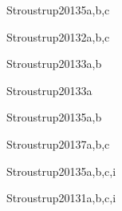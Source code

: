 \begin{syllabus}
   \begin{unit}{\SDFAlgorithmsandDesign}{}{Stroustrup2013}{5}{a,b,c}
      \SDFAlgorithmsandDesignAllTopics
      \SDFAlgorithmsandDesignAllLearningOutcomes
   \end{unit}
   
   \begin{unit}{\PLEventDrivenandReactiveProgramming}{}{Stroustrup2013}{2}{a,b,c}
      \PLEventDrivenandReactiveProgrammingAllTopics
      \PLEventDrivenandReactiveProgrammingAllLearningOutcomes
   \end{unit}
   
   \begin{unit}{\ALBasicAnalysis}{}{Stroustrup2013}{3}{a,b}
         \ALBasicAnalysisAllTopics
         \ALBasicAnalysisAllLearningOutcomes      
   \end{unit}
   
   \begin{unit}{\ALFundamentalDataStructuresandAlgorithms}{}{Stroustrup2013}{3}{a}
      \ALFundamentalDataStructuresandAlgorithmsAllTopics
      \ALFundamentalDataStructuresandAlgorithmsAllLearningOutcomes
   \end{unit}
   
   \begin{unit}{\OSOperatingSystemPrinciples}{}{Stroustrup2013}{5}{a,b}
      \OSOperatingSystemPrinciplesAllTopics
      \OSOperatingSystemPrinciplesAllLearningOutcomes
   \end{unit}
   
   \begin{unit}{\PLObjectOrientedProgramming}{}{Stroustrup2013}{7}{a,b,c}
      \PLObjectOrientedProgrammingAllTopics
      \PLObjectOrientedProgrammingAllLearningOutcome
   \end{unit}
   
   \begin{unit}{\SESoftwareDesign}{}{Stroustrup2013}{5}{a,b,c,i}
      \SESoftwareDesignAllTopics
      \SESoftwareDesignAllLearningOutcomes
   \end{unit}
   
   
   \begin{unit}{\SERequirementsEngineering}{}{Stroustrup2013}{1}{a,b,c,i}
      \SERequirementsEngineeringAllTopics
      \SERequirementsEngineeringAllLearningOutcomes
   \end{unit}
   
   \begin{coursebibliography}
   \end{coursebibliography}
   
   \end{syllabus}
   
   